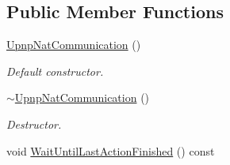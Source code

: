 \subsection*{Public Member Functions}
\begin{DoxyCompactItemize}
\item 
\hypertarget{class_upnp_nat_communication_a14c3b88f72d6156c64a60d26a7486997}{
\hyperlink{class_upnp_nat_communication_a14c3b88f72d6156c64a60d26a7486997}{UpnpNatCommunication} ()}
\label{class_upnp_nat_communication_a14c3b88f72d6156c64a60d26a7486997}

\begin{DoxyCompactList}\small\item\em Default constructor. \item\end{DoxyCompactList}\item 
\hypertarget{class_upnp_nat_communication_a25ab381b0c914241fb94630ffdae0942}{
\hyperlink{class_upnp_nat_communication_a25ab381b0c914241fb94630ffdae0942}{$\sim$UpnpNatCommunication} ()}
\label{class_upnp_nat_communication_a25ab381b0c914241fb94630ffdae0942}

\begin{DoxyCompactList}\small\item\em Destructor. \item\end{DoxyCompactList}\item 
\hypertarget{class_upnp_nat_communication_aa62acbbaa53a002b409e000f1be32833}{
void \hyperlink{class_upnp_nat_communication_aa62acbbaa53a002b409e000f1be32833}{WaitUntilLastActionFinished} () const }
\label{class_upnp_nat_communication_aa62acbbaa53a002b409e000f1be32833}


\end{DoxyCompactItemize}
